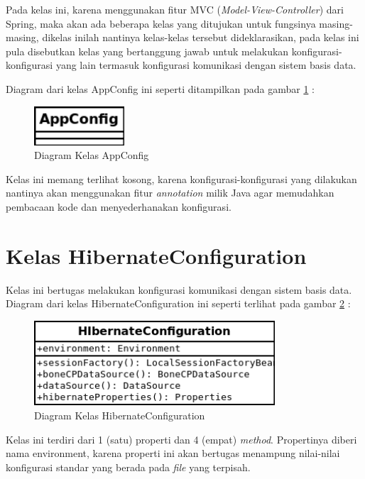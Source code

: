 Pada kelas ini, karena menggunakan fitur MVC (\textit{Model-View-Controller}) dari Spring, maka akan ada beberapa kelas yang ditujukan untuk fungsinya masing-masing, dikelas inilah nantinya kelas-kelas tersebut dideklarasikan, pada kelas ini pula disebutkan kelas yang bertanggung jawab untuk melakukan konfigurasi-konfigurasi yang lain termasuk konfigurasi komunikasi dengan sistem basis data.

Diagram dari kelas AppConfig ini seperti ditampilkan pada gambar \ref{fig:uml-class-AppConfig} :

\begin{figure}[H]
  \centering
  \includegraphics[width=0.3\textwidth]{./resources/uml/uml-class-AppConfig}
  \caption{Diagram Kelas AppConfig}
  \label{fig:uml-class-AppConfig}
\end{figure}

Kelas ini memang terlihat kosong, karena konfigurasi-konfigurasi yang dilakukan nantinya akan menggunakan fitur \textit{annotation} milik Java agar memudahkan pembacaan kode dan menyederhanakan konfigurasi.

\section{Kelas HibernateConfiguration}

Kelas ini bertugas melakukan konfigurasi komunikasi dengan sistem basis data. Diagram dari kelas HibernateConfiguration ini seperti terlihat pada gambar \ref{fig:uml-class-HibernateConfiguration} :

\begin{figure}[H]
  \centering
  \includegraphics[width=0.8\textwidth]{./resources/uml/uml-class-HibernateConfiguration}
  \caption{Diagram Kelas HibernateConfiguration}
  \label{fig:uml-class-HibernateConfiguration}
\end{figure}

Kelas ini terdiri dari 1 (satu) properti dan 4 (empat) \textit{method}. Propertinya diberi nama environment, karena properti ini akan bertugas menampung nilai-nilai konfigurasi standar yang berada pada \textit{file} yang terpisah.

